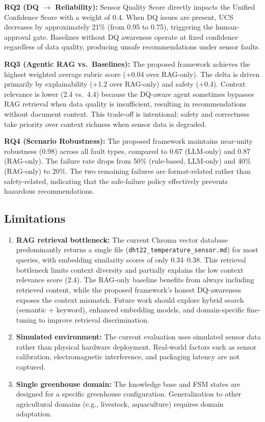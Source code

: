 \documentclass[runningheads]{llncs}
\begin{document}
\noindent\textbf{RQ2 (DQ $\rightarrow$ Reliability):} Sensor Quality Score directly impacts the Unified Confidence Score with a weight of 0.4. When DQ issues are present, UCS decreases by approximately 21\% (from 0.95 to 0.75), triggering the human-approval gate. Baselines without DQ awareness operate at fixed confidence regardless of data quality, producing unsafe recommendations under sensor faults.

\noindent\textbf{RQ3 (Agentic RAG vs.\ Baselines):} The proposed framework achieves the highest weighted average rubric score (+0.04 over RAG-only). The delta is driven primarily by explainability (+1.2 over RAG-only) and safety (+0.4). Context relevance is lower (2.4 vs.\ 4.4) because the DQ-aware agent sometimes bypasses RAG retrieval when data quality is insufficient, resulting in recommendations without document context. This trade-off is intentional: safety and correctness take priority over context richness when sensor data is degraded.

\noindent\textbf{RQ4 (Scenario Robustness):} The proposed framework maintains near-unity robustness (0.98) across all fault types, compared to 0.67 (LLM-only) and 0.87 (RAG-only). The failure rate drops from 50\% (rule-based, LLM-only) and 40\% (RAG-only) to 20\%. The two remaining failures are format-related rather than safety-related, indicating that the safe-failure policy effectively prevents hazardous recommendations.

\subsection{Limitations}
\begin{enumerate}
    \item \textbf{RAG retrieval bottleneck:} The current Chroma vector database predominantly returns a single file (\texttt{dht22\_temperature\_sensor.md}) for most queries, with embedding similarity scores of only 0.34--0.38. This retrieval bottleneck limits context diversity and partially explains the low context relevance score (2.4). The RAG-only baseline benefits from always including retrieved content, while the proposed framework's honest DQ-awareness exposes the context mismatch. Future work should explore hybrid search (semantic + keyword), enhanced embedding models, and domain-specific fine-tuning to improve retrieval discrimination.
    \item \textbf{Simulated environment:} The current evaluation uses simulated sensor data rather than physical hardware deployment. Real-world factors such as sensor calibration, electromagnetic interference, and packaging latency are not captured.
    \item \textbf{Single greenhouse domain:} The knowledge base and FSM states are designed for a specific greenhouse configuration. Generalization to other agricultural domains (e.g., livestock, aquaculture) requires domain adaptation.
\end{enumerate}
\end{document}

